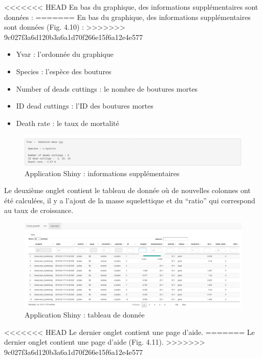 \documentclass[]{report}
\providecommand{\tightlist}{%
  \setlength{\itemsep}{0pt}\setlength{\parskip}{0pt}}
\begin{document}
<<<<<<< HEAD
En bas du graphique, des informations supplémentaires sont données :
=======
En bas du graphique, des informations supplémentaires sont données (Fig.
4.10) :
>>>>>>> 9c027f3a6d120b3a6a1d70f266e15f6a12e4e577

\begin{itemize}
\tightlist
\item
  Yvar : l'ordonnée du graphique
\item
  Species : l'espèce des boutures
\item
  Number of deads cuttings : le nombre de boutures mortes
\item
  ID dead cuttings : l'ID des boutures mortes
\item
  Death rate : le taux de mortalité
\end{itemize}

\begin{figure}[h!]
\includegraphics[]{../image/verbatim.PNG}
\caption{Application Shiny : informations supplémentaires}
\end{figure}

Le deuxième onglet contient le tableau de donnée où de nouvelles
colonnes ont été calculées, il y a l'ajout de la masse squelettique et
du ``ratio'' qui correspond au taux de croissance.

\begin{figure}[h!]
\includegraphics[]{../image/notebook-table1.png}
\caption{Application Shiny : tableau de donnée}
\end{figure}

<<<<<<< HEAD
Le dernier onglet contient une page d'aide.
=======
Le dernier onglet contient une page d'aide (Fig. 4.11).
>>>>>>> 9c027f3a6d120b3a6a1d70f266e15f6a12e4e577
\end{document}
